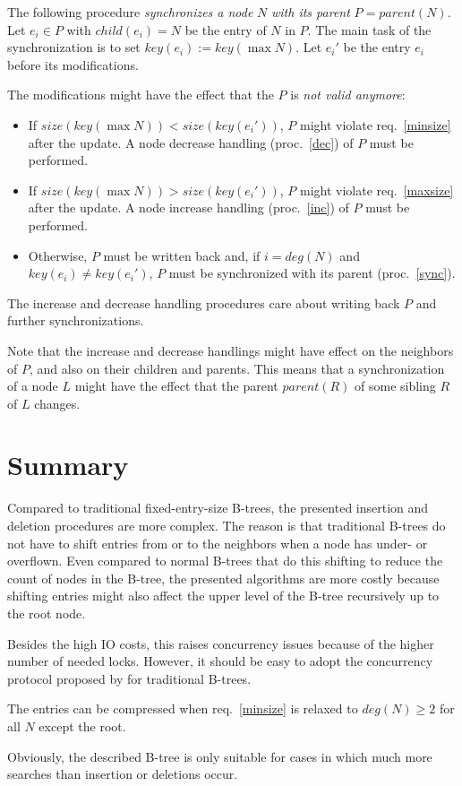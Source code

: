 \documentclass{vldb}
\begin{document}
\begin{proc} \label{sync}
The following procedure {\em synchronizes a node} $N$ {\em with its parent}
$P = parent(N)$.
Let \mbox{$e_i \in P$} with \mbox{$child(e_i) = N$} be the entry of
$N$ in $P$.
The main task of the synchronization is to set \mbox{$key(e_i) := key(\max N)$}.
Let $e_i'$ be the entry $e_i$ before its modifications.

The modifications might have the effect that the $P$ is {\em not valid anymore}:
\begin{itemize}
\item If \mbox{$size(key(\max N)) < size(key(e_i'))$},
    $P$ might violate req.~\ref{minsize} after the update.
    A node decrease handling (proc.~\ref{dec}) of $P$ must be performed.
\item If \mbox{$size(key(\max N)) > size(key(e_i'))$},
    $P$ might violate req.~\ref{maxsize} after the update.
    A node increase handling (proc.~\ref{inc}) of $P$ must be performed.
\item Otherwise, $P$ must be written back and, if $i = deg(N)$ and
    $key(e_i) \neq key(e_i')$, $P$ must be synchronized with its parent
    (proc.~\ref{sync}).
\end{itemize}

The increase and decrease handling procedures care about writing back $P$
and further synchronizations.

Note that the increase and decrease handlings might have effect on the
neighbors of $P$, and also on their children and parents.
This means that a synchronization of a node $L$ might have the effect that
the parent $parent(R)$ of some sibling $R$ of $L$ changes.
\end{proc}



\section{Summary}

Compared to traditional fixed-entry-size B-trees, the
presented insertion and deletion procedures are more complex.
The reason is that traditional B-trees do not have to shift
entries from or to the neighbors when a node has under- or overflown.
Even compared to normal B-trees that do this shifting to
reduce the count of nodes in the B-tree, the presented algorithms are more
costly because shifting entries might also affect the upper level of the B-tree
recursively up to the root node.

Besides the high IO costs, this raises concurrency issues because of the higher
number of needed locks.
However, it should be easy to adopt the concurrency protocol proposed by
\cite{Lehman} for traditional B-trees.

The entries can be compressed when req.~\ref{minsize} is relaxed to
\mbox{$deg(N) \geq 2$} for all $N$ except the root.

Obviously, the described B-tree is only suitable for cases in
which much more searches than insertion or deletions occur.




\end{document}
